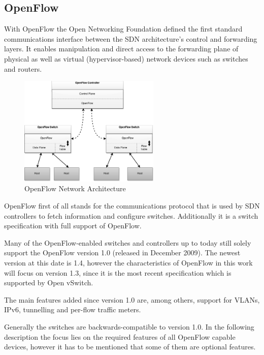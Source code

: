 \subsection{OpenFlow}


With OpenFlow the Open Networking Foundation defined the first standard communications interface between the SDN architecture's control and forwarding layers. It enables manipulation and direct access to the forwarding plane of physical as well as virtual (hypervisor-based) network devices such as switches and routers. \cite{onfnewnorm}

\begin{figure}[H]
\centering

\includegraphics[width=0.6\textwidth]{images/fundamentals/openflow_architecture.png}

\caption{OpenFlow Network Architecture}
\end{figure}

OpenFlow first of all stands for the communications protocol that is used by SDN controllers to fetch information and configure switches. Additionally it is a switch specification with full support of OpenFlow.

Many of the OpenFlow-enabled switches and controllers up to today still solely support the OpenFlow version 1.0 (released in December 2009). The newest version at this date is 1.4, however the characteristics of OpenFlow in this work will focus on version 1.3, since it is the most recent specification which is supported by Open vSwitch.

The main features added since version 1.0 are, among others, support for VLANs, IPv6, tunnelling and per-flow traffic meters. \cite{ofversion13}

Generally the switches are backwards-compatible to version 1.0. In the following description the focus lies on the required features of all OpenFlow capable devices, however it has to be mentioned that some of them are optional features.

